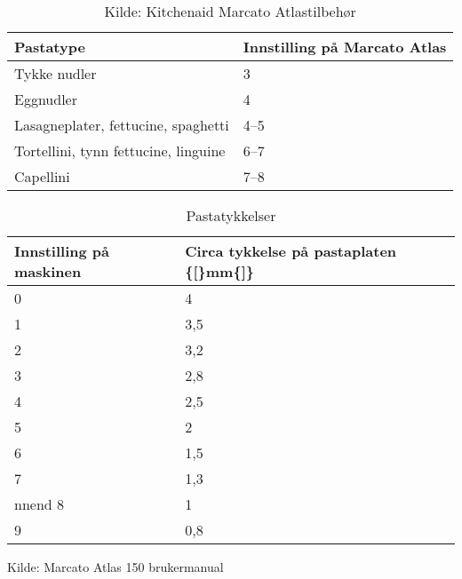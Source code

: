 \begin{table}[]
\centering
\begin{tabular}{ll}
\hline
Pastatype                            & Innstilling på Marcato Atlas \\ \hline
Tykke nudler                         & 3                            \\
Eggnudler                            & 4                            \\
Lasagneplater, fettucine, spaghetti  & 4--5                         \\
Tortellini, tynn fettucine, linguine & 6--7                         \\
Capellini                            & 7--8                         \\ \hline
\end{tabular}
\caption{Kilde: Kitchenaid Marcato Atlastilbehør}
\label{pastatyper}
\end{table}


\begin{table}[]
\centering
\begin{tabular}{ll}
\hline
Innstilling på maskinen & Circa tykkelse på pastaplaten \{{[}\}mm\{{]}\} \\ \hline
0                       & 4                                              \\
1                       & 3,5                                            \\
2                       & 3,2                                            \\
3                       & 2,8                                            \\
4                       & 2,5                                            \\
5                       & 2                                              \\
6                       & 1,5                                            \\
7                       & 1,3                                            \\nnend
8                       & 1                                              \\
9                       & 0,8                                            \\ \hline
\end{tabular}
\caption{Pastatykkelser}
\label{pastatykkelser}
\end{table}

Kilde: Marcato Atlas 150 brukermanual
